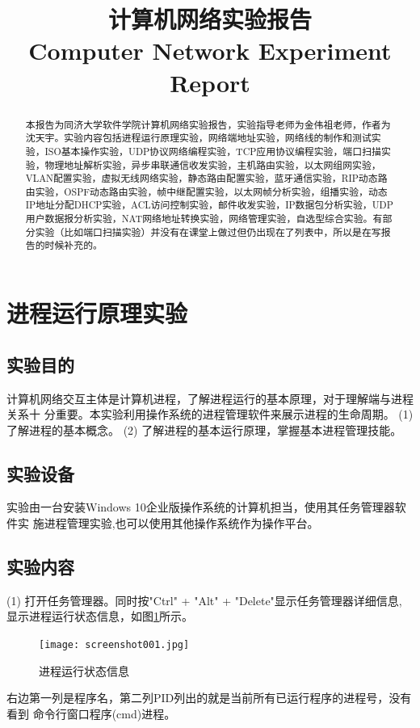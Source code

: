 \documentclass[lang=cn,11pt,a4paper,cite=authoryear]{elegantpaper}
\title{计算机网络实验报告\\
	
\small{Computer Network Experiment Report}
}
\author{}
\institute{\href{http://imsty.cn/}{沈天宇 \\ 1851521}}
\date{\zhtoday}
\begin{document}
\maketitle

\begin{abstract}
本报告为同济大学软件学院计算机网络实验报告，实验指导老师为金伟祖老师，作者为沈天宇。实验内容包括进程运行原理实验，网络端地址实验，网络线的制作和测试实验，ISO基本操作实验，UDP协议网络编程实验，TCP应用协议编程实验，端口扫描实验，物理地址解析实验，异步串联通信收发实验，主机路由实验，以太网组网实验，VLAN配置实验，虚拟无线网络实验，静态路由配置实验，蓝牙通信实验，RIP动态路由实验，OSPF动态路由实验，帧中继配置实验，以太网帧分析实验，组播实验，动态IP地址分配DHCP实验，ACL访问控制实验，邮件收发实验，IP数据包分析实验，UDP用户数据报分析实验，NAT网络地址转换实验，网络管理实验，自选型综合实验。有部分实验（比如端口扫描实验）并没有在课堂上做过但仍出现在了列表中，所以是在写报告的时候补充的。

\end{abstract}
\tableofcontents


\section{进程运行原理实验}
\subsection{实验目的}
计算机网络交互主体是计算机进程，了解进程运行的基本原理，对于理解端与进程关系十 分重要。本实验利用操作系统的进程管理软件来展示进程的生命周期。
(1)	了解进程的基本概念。
(2)	了解进程的基本运行原理，掌握基本进程管理技能。

\subsection{实验设备}
实验由一台安装Windows 10企业版操作系统的计算机担当，使用其任务管理器软件实 施进程管理实验,也可以使用其他操作系统作为操作平台。
\subsection{实验内容}
(1) 打开任务管理器。同时按"Ctrl" + "Alt" + "Delete"显示任务管理器详细信息, 显示进程运行状态信息，如图\ref{fig:screenshot001}所示。
\begin{figure}[htbp]
	\centering
	\texttt{[image: screenshot001.jpg]}
	\caption{进程运行状态信息}
	\label{fig:screenshot001}
\end{figure}
右边第一列是程序名，第二列PID列出的就是当前所有已运行程序的进程号，没有看到 命令行窗口程序(cmd)进程。
\end{document}
